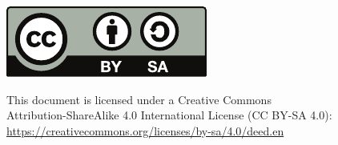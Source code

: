 \includegraphics[scale=0.7]{figures/cc-by-sa.pdf}

\vspace{0.5em}

This document is licensed under a Creative Commons \\
Attribution-ShareAlike 4.0 International License (CC BY-SA 4.0): \\
\url{https://creativecommons.org/licenses/by-sa/4.0/deed.en}
